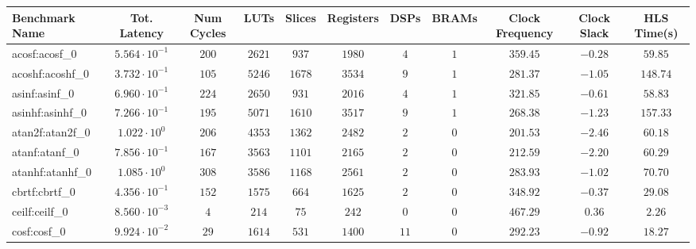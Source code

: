 \begin{tabular}{|l|c|c|c|c|c|c|c|c|c|c|}
\hline
Benchmark Name               & Tot. Latency            & Num Cycles & LUTs      & Slices    & Registers & DSPs    & BRAMs   & Clock Frequency & Clock Slack & HLS Time(s) \\
\hline
acosf:acosf\_0               & $ 5.564 \cdot 10^{-1} $ & $ 200    $ & $ 2621  $ & $ 937   $ & $ 1980  $ & $ 4   $ & $ 1   $ & $ 359.45      $ & $ -0.28   $ & $ 59.85   $ \\
acoshf:acoshf\_0             & $ 3.732 \cdot 10^{-1} $ & $ 105    $ & $ 5246  $ & $ 1678  $ & $ 3534  $ & $ 9   $ & $ 1   $ & $ 281.37      $ & $ -1.05   $ & $ 148.74  $ \\
asinf:asinf\_0               & $ 6.960 \cdot 10^{-1} $ & $ 224    $ & $ 2650  $ & $ 931   $ & $ 2016  $ & $ 4   $ & $ 1   $ & $ 321.85      $ & $ -0.61   $ & $ 58.83   $ \\
asinhf:asinhf\_0             & $ 7.266 \cdot 10^{-1} $ & $ 195    $ & $ 5071  $ & $ 1610  $ & $ 3517  $ & $ 9   $ & $ 1   $ & $ 268.38      $ & $ -1.23   $ & $ 157.33  $ \\
atan2f:atan2f\_0             & $ 1.022 \cdot 10^{0}  $ & $ 206    $ & $ 4353  $ & $ 1362  $ & $ 2482  $ & $ 2   $ & $ 0   $ & $ 201.53      $ & $ -2.46   $ & $ 60.18   $ \\
atanf:atanf\_0               & $ 7.856 \cdot 10^{-1} $ & $ 167    $ & $ 3563  $ & $ 1101  $ & $ 2165  $ & $ 2   $ & $ 0   $ & $ 212.59      $ & $ -2.20   $ & $ 60.29   $ \\
atanhf:atanhf\_0             & $ 1.085 \cdot 10^{0}  $ & $ 308    $ & $ 3586  $ & $ 1168  $ & $ 2561  $ & $ 2   $ & $ 0   $ & $ 283.93      $ & $ -1.02   $ & $ 70.70   $ \\
cbrtf:cbrtf\_0               & $ 4.356 \cdot 10^{-1} $ & $ 152    $ & $ 1575  $ & $ 664   $ & $ 1625  $ & $ 2   $ & $ 0   $ & $ 348.92      $ & $ -0.37   $ & $ 29.08   $ \\
ceilf:ceilf\_0               & $ 8.560 \cdot 10^{-3} $ & $ 4      $ & $ 214   $ & $ 75    $ & $ 242   $ & $ 0   $ & $ 0   $ & $ 467.29      $ & $ 0.36    $ & $ 2.26    $ \\
cosf:cosf\_0                 & $ 9.924 \cdot 10^{-2} $ & $ 29     $ & $ 1614  $ & $ 531   $ & $ 1400  $ & $ 11  $ & $ 0   $ & $ 292.23      $ & $ -0.92   $ & $ 18.27   $ \\

\end{tabular}
